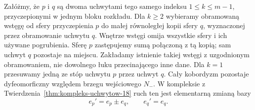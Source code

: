 \begin{stwierdzenie}
\label{prop:slide-18}
Załóżmy, że $p$ i $q$ są dwoma uchwytami
tego samego indeksu $1\leq k\leq m-1$,
przyczepionymi w jednym bloku rozkładu.
Dla $k\geq2$ wybieramy obramowaną wstęgę od sfery
przyczepienia $p$ do małej równoległej kopii sfery $q$,
wyznaczonej przez obramowanie uchwytu $q$.
Wnętrze wstęgi omija wszystkie sfery i ich używane
pogrubienia. Sferę $p$ zastępujemy sumą połączoną
z tą kopią; sam uchwyt $q$ pozostaje na miejscu.
Zakładamy istnienie takiej wstęgi z uzgodnionym
obramowaniem, nie dowolnego łuku przecinającego inne dane.
Dla $k=1$ przesuwamy jedną ze stóp
uchwytu $p$ przez uchwyt $q$.
Cały kobordyzm pozostaje dyfeomorficzny
względem brzegu wejściowego $N_-$.
W kompleksie z
Twierdzenia~\ref{thm:kompleks-uchwytow-18}
ruch ten jest elementarną zmianą bazy
\begin{equation}\label{eq:slide-baza-18}
 e_p'=e_p\pm e_q,\qquad e_q'=e_q.
\end{equation}
\end{stwierdzenie}
